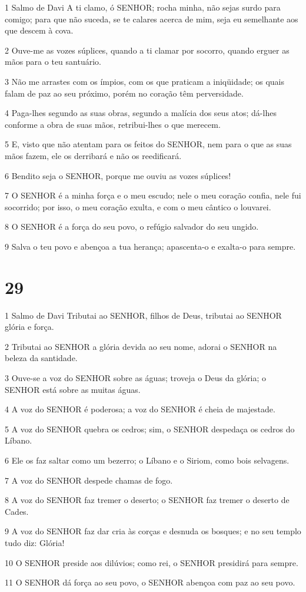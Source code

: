 \par 1 Salmo de Davi A ti clamo, ó SENHOR; rocha minha, não sejas surdo para comigo; para que não suceda, se te calares acerca de mim, seja eu semelhante aos que descem à cova.
\par 2 Ouve-me as vozes súplices, quando a ti clamar por socorro, quando erguer as mãos para o teu santuário.
\par 3 Não me arrastes com os ímpios, com os que praticam a iniqüidade; os quais falam de paz ao seu próximo, porém no coração têm perversidade.
\par 4 Paga-lhes segundo as suas obras, segundo a malícia dos seus atos; dá-lhes conforme a obra de suas mãos, retribui-lhes o que merecem.
\par 5 E, visto que não atentam para os feitos do SENHOR, nem para o que as suas mãos fazem, ele os derribará e não os reedificará.
\par 6 Bendito seja o SENHOR, porque me ouviu as vozes súplices!
\par 7 O SENHOR é a minha força e o meu escudo; nele o meu coração confia, nele fui socorrido; por isso, o meu coração exulta, e com o meu cântico o louvarei.
\par 8 O SENHOR é a força do seu povo, o refúgio salvador do seu ungido.
\par 9 Salva o teu povo e abençoa a tua herança; apascenta-o e exalta-o para sempre.

\chapter{29}

\par 1 Salmo de Davi Tributai ao SENHOR, filhos de Deus, tributai ao SENHOR glória e força.
\par 2 Tributai ao SENHOR a glória devida ao seu nome, adorai o SENHOR na beleza da santidade.
\par 3 Ouve-se a voz do SENHOR sobre as águas; troveja o Deus da glória; o SENHOR está sobre as muitas águas.
\par 4 A voz do SENHOR é poderosa; a voz do SENHOR é cheia de majestade.
\par 5 A voz do SENHOR quebra os cedros; sim, o SENHOR despedaça os cedros do Líbano.
\par 6 Ele os faz saltar como um bezerro; o Líbano e o Siriom, como bois selvagens.
\par 7 A voz do SENHOR despede chamas de fogo.
\par 8 A voz do SENHOR faz tremer o deserto; o SENHOR faz tremer o deserto de Cades.
\par 9 A voz do SENHOR faz dar cria às corças e desnuda os bosques; e no seu templo tudo diz: Glória!
\par 10 O SENHOR preside aos dilúvios; como rei, o SENHOR presidirá para sempre.
\par 11 O SENHOR dá força ao seu povo, o SENHOR abençoa com paz ao seu povo.

